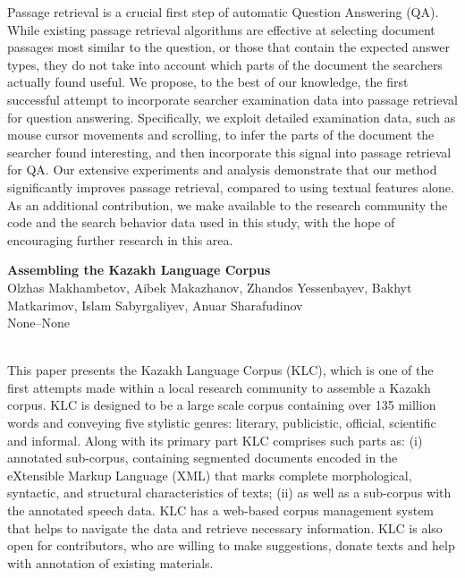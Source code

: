 \documentclass[twoside,makeidx]{book}
\renewcommand{\normalsize}{\fontsize{8}{9}\selectfont}
\renewcommand{\small}{\fontsize{7}{8}\selectfont}
\begin{document}
{\small Passage retrieval is a crucial first step of automatic Question Answering (QA). While existing passage retrieval algorithms are effective at selecting document passages most similar to the question, or those that contain the expected answer types, they do not take into account which parts of the document the searchers actually found useful. We propose, to the best of our knowledge, the first successful attempt to incorporate searcher examination data into passage retrieval for question answering. Specifically, we exploit detailed examination data, such as mouse cursor movements and scrolling, to infer the parts of the document the searcher found interesting, and then incorporate this signal into passage retrieval for QA. Our extensive experiments and analysis demonstrate that our method significantly improves passage retrieval, compared to using textual features alone. As an additional contribution, we make available to the research community the code and the search behavior data used in this study, with the hope of encouraging further research in this area.}
\par\vspace{2em}\noindent%
\begin{minipage}{\linewidth}%
\begin{center}
\textbf{\normalsize Assembling the Kazakh Language Corpus}\\
\normalsize  Olzhas Makhambetov,  Aibek Makazhanov,  Zhandos Yessenbayev,  Bakhyt Matkarimov,  Islam Sabyrgaliyev,  Anuar Sharafudinov\\
{\small None--None}\\
\end{center}
\end{minipage}\\[0.5em]
\nopagebreak%
\noindent%
{\small This paper presents the Kazakh Language Corpus (KLC), which is one of the first attempts made within a local research community to assemble a Kazakh corpus. KLC is designed to be a large scale corpus containing over 135 million words and conveying five stylistic genres: literary, publicistic, official, scientific and informal. Along with its primary part KLC comprises such parts as: (i) annotated sub-corpus, containing segmented documents encoded in the eXtensible Markup Language (XML) that marks complete morphological, syntactic, and structural characteristics of texts; (ii) as well as a sub-corpus with the annotated speech data. KLC has a web-based corpus management system that helps to navigate the data and retrieve necessary information. KLC is also open for contributors, who are willing to make suggestions, donate texts and help with annotation of existing materials.}
\end{document}
